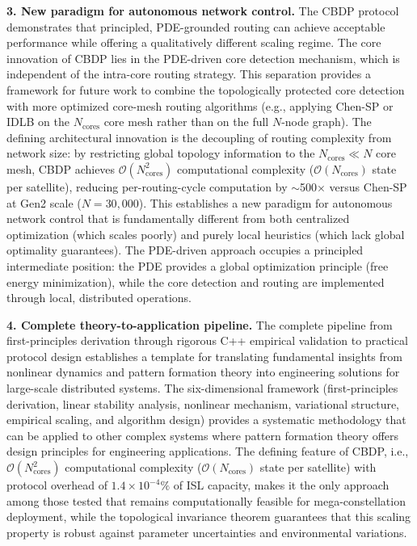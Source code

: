 \documentclass[sn-nature,pdflatex]{sn-jnl}
\begin{document}
\textbf{3. New paradigm for autonomous network control.}
The CBDP protocol demonstrates that principled, PDE-grounded routing can achieve acceptable performance while offering a qualitatively different scaling regime. The core innovation of CBDP lies in the PDE-driven core detection mechanism, which is independent of the intra-core routing strategy. This separation provides a framework for future work to combine the topologically protected core detection with more optimized core-mesh routing algorithms (e.g., applying Chen-SP or IDLB on the $N_{\text{cores}}$ core mesh rather than on the full $N$-node graph). The defining architectural innovation is the decoupling of routing complexity from network size: by restricting global topology information to the $N_{\text{cores}} \ll N$ core mesh, CBDP achieves $\mathcal{O}(N_{\text{cores}}^2)$ computational complexity ($\mathcal{O}(N_{\text{cores}})$ state per satellite), reducing per-routing-cycle computation by $\sim$500$\times$ versus Chen-SP at Gen2 scale ($N=30,000$). This establishes a new paradigm for autonomous network control that is fundamentally different from both centralized optimization (which scales poorly) and purely local heuristics (which lack global optimality guarantees). The PDE-driven approach occupies a principled intermediate position: the PDE provides a global optimization principle (free energy minimization), while the core detection and routing are implemented through local, distributed operations.

\textbf{4. Complete theory-to-application pipeline.}
The complete pipeline from first-principles derivation through rigorous C++ empirical validation to practical protocol design establishes a template for translating fundamental insights from nonlinear dynamics and pattern formation theory into engineering solutions for large-scale distributed systems. The six-dimensional framework (first-principles derivation, linear stability analysis, nonlinear mechanism, variational structure, empirical scaling, and algorithm design) provides a systematic methodology that can be applied to other complex systems where pattern formation theory offers design principles for engineering applications. The defining feature of CBDP, i.e., $\mathcal{O}(N_{\text{cores}}^2)$ computational complexity ($\mathcal{O}(N_{\text{cores}})$ state per satellite) with protocol overhead of $1.4 \times 10^{-4}\%$ of ISL capacity, makes it the only approach among those tested that remains computationally feasible for mega-constellation deployment, while the topological invariance theorem guarantees that this scaling property is robust against parameter uncertainties and environmental variations.
\end{document}
